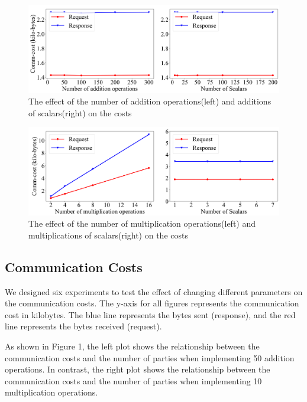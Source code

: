 \documentclass[10pt,conference,compsocconf]{IEEEtran}
\begin{document}
\begin{figure}[!t]
\includegraphics[width=1.0\linewidth]{figure/communication_cost_res_add_increase_scalar_increase.png}
\caption{The effect of the number of addition operations(left) and additions of scalars(right) on the costs}
\label{figure-2}
\end{figure}

\begin{figure}[!t]
\includegraphics[width=1.0\linewidth]{figure/communication_cost_res_mul_increase_scalar_increase.png}
\caption{The effect of the number of multiplication operations(left) and multiplications of scalars(right) on the costs}
\label{figure-3}
\end{figure}

\subsection{Communication Costs}
We designed six experiments to test the effect of changing different parameters on the communication costs. The y-axis for all figures represents the communication cost in kilobytes. The blue line represents the bytes sent (response), and the red line represents the bytes received (request).

As shown in Figure 1, the left plot shows the relationship between the communication costs and the number of parties when implementing 50 addition operations. In contrast, the right plot shows the relationship between the communication costs and the number of parties when implementing 10 multiplication operations.
\end{document}
